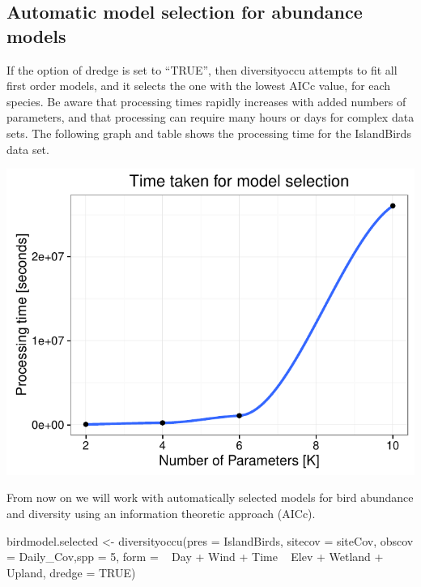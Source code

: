 \documentclass[article]{jss}
\begin{document}
\subsection{Automatic model selection for abundance
models}\label{automatic-model-selection-for-abundance-models}

If the option of dredge is set to ``TRUE'', then diversityoccu attempts
to fit all first order models, and it selects the one with the lowest
AICc value, for each species. Be aware that processing times rapidly
increases with added numbers of parameters, and that processing can
require many hours or days for complex data sets. The following graph
and table shows the processing time for the IslandBirds data set.

\begin{CodeChunk}


\begin{center}\includegraphics{diversityocc_files/figure-latex/unnamed-chunk-13-1} \end{center}

\end{CodeChunk}

From now on we will work with automatically selected models for bird
abundance and diversity using an information theoretic approach (AICc).

\begin{CodeChunk}
\begin{CodeInput}
birdmodel.selected <- diversityoccu(pres = IslandBirds, sitecov = siteCov,
obscov = Daily_Cov,spp =  5, form = ~ Day + Wind + Time ~ Elev + Wetland + Upland, dredge = TRUE)
\end{CodeInput}
\end{CodeChunk}
\end{document}
